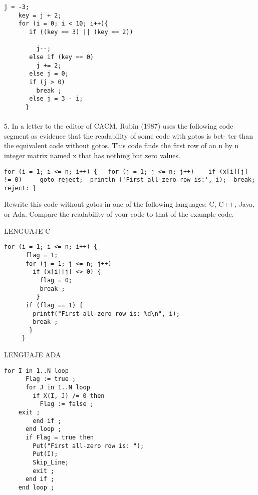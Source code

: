 \documentclass[../main.tex]{subfiles}
\begin{document}
\begin{lstlisting}[frame=single]
    j = -3; 
    key = j + 2; 
    for (i = 0; i < 10; i++){ 
       if ((key == 3) || (key == 2)) 
 
         j--; 
       else if (key == 0) 
         j += 2; 
       else j = 0; 
       if (j > 0) 
         break ; 
       else j = 3 - i; 
      } 

\end{lstlisting}


\paragraph{ }
 5. In a letter to the editor of CACM, Rubin (1987) uses the following code segment as evidence that the readability of some code with gotos is bet- ter than the equivalent code without gotos. This code finds the first row of an n by n integer matrix named x that has nothing but zero values.
\begin{lstlisting}
for (i = 1; i <= n; i++) {   for (j = 1; j <= n; j++)    if (x[i][j] != 0)     goto reject;  println ('First all-zero row is:', i);  break; reject: }
\end{lstlisting}
Rewrite this code without gotos in one of the following languages: C, C++, Java, or Ada. Compare the readability of your code to that of the example code.


LENGUAJE C
\begin{lstlisting}[frame=single]
    for (i = 1; i <= n; i++) { 
      flag = 1; 
      for (j = 1; j <= n; j++) 
        if (x[i][j] <> 0) { 
          flag = 0; 
          break ;  
         } 
      if (flag == 1) { 
        printf("First all-zero row is: %d\n", i); 
        break ; 
       } 
     }  
\end{lstlisting}

LENGUAJE ADA
\begin{lstlisting}[frame=single]
    for I in 1..N loop 
      Flag := true ; 
      for J in 1..N loop 
        if X(I, J) /= 0 then 
          Flag := false ;
    exit ; 
        end if ; 
      end loop ; 
      if Flag = true then 
        Put("First all-zero row is: "); 
        Put(I); 
        Skip_Line; 
        exit ; 
      end if ; 
    end loop ;
\end{lstlisting}

\clearpage
\end{document}
